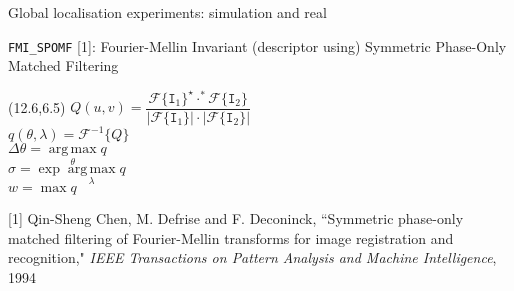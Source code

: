 \begin{frame}{Global localisation experiments: simulation and real}


  {\small
  \texttt{FMI\_SPOMF} [1]: Fourier-Mellin Invariant (descriptor using) Symmetric Phase-Only Matched Filtering
  }

  \begin{figure}
    
  \end{figure}


  \begin{textblock}{14}(12.6,6.5)
    {\tiny $Q(u,v) = \dfrac{\mathcal{F}\{\texttt{I}_1\}^{\star} \cdot^\ast \mathcal{F}\{\texttt{I}_2\}}{|\mathcal{F}\{\texttt{I}_1\}| \cdot |\mathcal{F}\{\texttt{I}_2\}|}$}\\
    {\tiny $q(\theta, \lambda) = \mathcal{F}^{-1}\{Q\}$}\\
    {\tiny $\Delta \theta = \operatorname*{arg\,max}\limits_\theta q$}\\
    {\tiny $\sigma = \exp{\operatorname*{arg\,max}\limits_\lambda q}$}\\
    {\tiny $w = \max q$}
  \end{textblock}

  \placebottom
  \tiny
  [1] Qin-Sheng Chen, M. Defrise and F. Deconinck, ``Symmetric phase-only matched filtering of Fourier-Mellin transforms for image registration and recognition," \textit{IEEE Transactions on Pattern Analysis and Machine Intelligence}, 1994




\end{frame}
